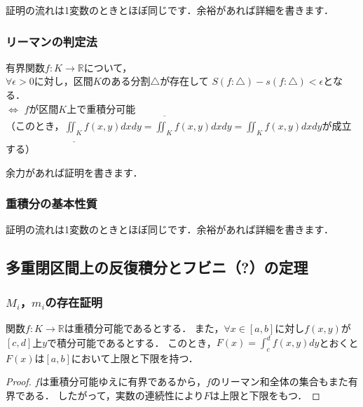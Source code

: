 \documentclass[./index]{subfiles}
\begin{document}
証明の流れは1変数のときとほぼ同じです．余裕があれば詳細を書きます．

\subsubsection{リーマンの判定法}
\begin{screen}
    \begin{proposition}
        有界関数$f: K \rightarrow \mathbb{R}$について， \\
        $\forall \epsilon > 0$に対し，区間$K$のある分割$\triangle$が存在して
        $S(f: \triangle) - s(f: \triangle) < \epsilon$となる． \\
        \quad $\Longleftrightarrow$ $f$が区間$K$上で重積分可能 \\
        （このとき，$\underline{\iint_K} f(x, y) dx dy = \overline{\iint_K} f(x, y) dx dy
            = \iint_K f(x, y) dx dy$が成立する）
    \end{proposition}
\end{screen}

余力があれば証明を書きます．

\subsubsection{重積分の基本性質}

証明の流れは1変数のときとほぼ同じです．余裕があれば詳細を書きます．

\subsection{多重閉区間上の反復積分とフビニ（?）の定理}
\subsubsection{$M_i$，$m_i$の存在証明}
\begin{screen}
    \begin{proposition}
        関数$f: K \rightarrow \mathbb{R}$は重積分可能であるとする．
        また，$\forall x \in [a, b]$に対し$f(x, y)$が$[c, d]$上$y$で積分可能であるとする．
        このとき，$F(x) = \int_c^d f(x, y) dy$とおくと$F(x)$は$[a, b]$において上限と下限を持つ．
    \end{proposition}
\end{screen}

\begin{proof}
    $f$は重積分可能ゆえに有界であるから，$f$のリーマン和全体の集合もまた有界である．
    したがって，実数の連続性により$F$は上限と下限をもつ．
\end{proof}
\end{document}
